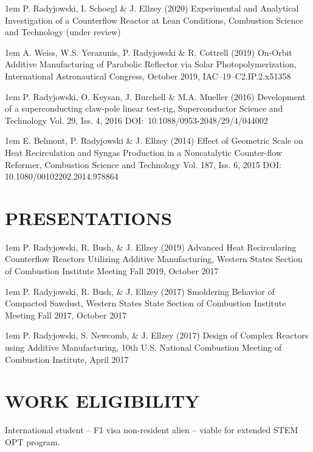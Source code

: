 \documentclass[11pt]{res}
\begin{document}
\begin{resume}
    \hangindent 1em
    P. Radyjowski, I. Schoegl \& J. Ellzey (2020) Experimental and Analytical Investigation of a Counterflow Reactor at Lean Conditions, Combustion Science and Technology (under review)
    
    \hangindent 1em
	A. Weiss, W.S. Yerazunis, P. Radyjowski \& R. Cottrell (2019) On-Orbit Additive Manufacturing of Parabolic Reflector via Solar Photopolymerization, International Astronautical Congress, October 2019, IAC–19–C2.IP.2.x51358

  	\hangindent 1em
	P. Radyjowski, O. Keysan, J. Burchell \& M.A. Mueller (2016) Development of a superconducting claw-pole linear test-rig, Superconductor Science and Technology Vol. 29, Iss. 4, 2016 DOI:~10.1088/0953-2048/29/4/044002


  	\hangindent 1em
	E. Belmont, P. Radyjowski \& J. Ellzey (2014) Effect of Geometric Scale on Heat Recirculation and Syngas Production in a Noncatalytic Counter-flow Reformer, Combustion Science and Technology Vol. 187, Iss. 6, 2015 DOI: 10.1080/00102202.2014.978864


\section{PRESENTATIONS}
\vspace{5pt}

   	\hangindent 1em
	P. Radyjowski, R. Bush, \& J. Ellzey (2019) Advanced Heat Recircularing Counterflow Reactors Utilizing Additive Manufacturing, Western States Section of Combustion Institute Meeting Fall 2019, October 2017	
  
   	\hangindent 1em
	P. Radyjowski, R. Bush, \& J. Ellzey (2017) Smoldering Behavior of Compacted Sawdust, Western States State Section of Combustion Institute Meeting Fall 2017, October 2017
 
 
   	\hangindent 1em
	P. Radyjowski, S. Newcomb, \& J. Ellzey (2017) Design of Complex Reactors using Additive Manufacturing, 10th U.S. National Combustion Meeting of Combustion Institute, April 2017

\vfill

\section{WORK ELIGIBILITY}
\vspace{5pt}

	International student {}-- F1 visa non-resident alien {}-- viable for extended STEM OPT program.  

\end{resume}
\end{document}
